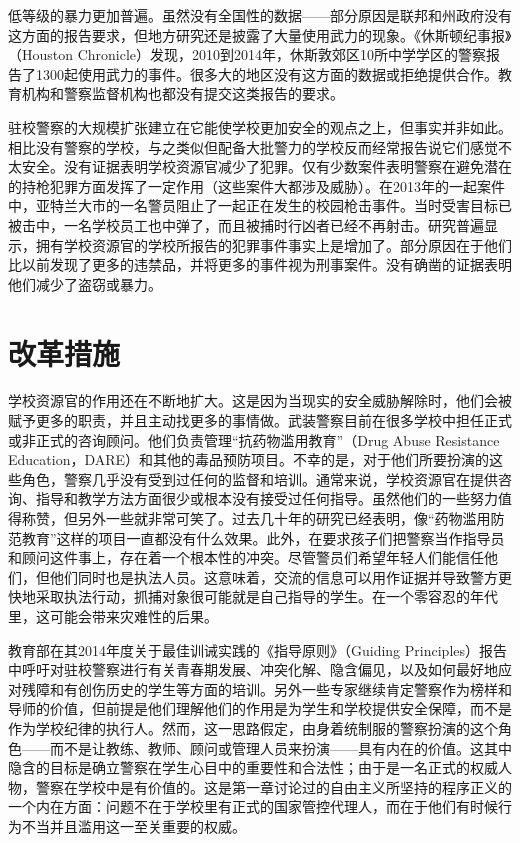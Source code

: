 \documentclass[fontset=fandol, a4paper, 12pt, openright]{ctexbook}
\begin{document}
低等级的暴力更加普遍。虽然没有全国性的数据——部分原因是联邦和州政府没有这方面的报告要求，但地方研究还是披露了大量使用武力的现象。《休斯顿纪事报》（Houston Chronicle）发现，2010到2014年，休斯敦郊区10所中学学区的警察报告了1300起使用武力的事件。很多大的地区没有这方面的数据或拒绝提供合作。教育机构和警察监督机构也都没有提交这类报告的要求。

驻校警察的大规模扩张建立在它能使学校更加安全的观点之上，但事实并非如此。相比没有警察的学校，与之类似但配备大批警力的学校反而经常报告说它们感觉不太安全。没有证据表明学校资源官减少了犯罪。仅有少数案件表明警察在避免潜在的持枪犯罪方面发挥了一定作用（这些案件大都涉及威胁）。在2013年的一起案件中，亚特兰大市的一名警员阻止了一起正在发生的校园枪击事件。当时受害目标已被击中，一名学校员工也中弹了，而且被捕时行凶者已经不再射击。研究普遍显示，拥有学校资源官的学校所报告的犯罪事件事实上是增加了。部分原因在于他们比以前发现了更多的违禁品，并将更多的事件视为刑事案件。没有确凿的证据表明他们减少了盗窃或暴力。

\section{改革措施}

学校资源官的作用还在不断地扩大。这是因为当现实的安全威胁解除时，他们会被赋予更多的职责，并且主动找更多的事情做。武装警察目前在很多学校中担任正式或非正式的咨询顾问。他们负责管理“抗药物滥用教育”（Drug Abuse Resistance Education，DARE）和其他的毒品预防项目。不幸的是，对于他们所要扮演的这些角色，警察几乎没有受到过任何的监督和培训。通常来说，学校资源官在提供咨询、指导和教学方法方面很少或根本没有接受过任何指导。虽然他们的一些努力值得称赞，但另外一些就非常可笑了。过去几十年的研究已经表明，像“药物滥用防范教育”这样的项目一直都没有什么效果。此外，在要求孩子们把警察当作指导员和顾问这件事上，存在着一个根本性的冲突。尽管警员们希望年轻人们能信任他们，但他们同时也是执法人员。这意味着，交流的信息可以用作证据并导致警方更快地采取执法行动，抓捕对象很可能就是自己指导的学生。在一个零容忍的年代里，这可能会带来灾难性的后果。

教育部在其2014年度关于最佳训诫实践的《指导原则》（Guiding Principles）报告中呼吁对驻校警察进行有关青春期发展、冲突化解、隐含偏见，以及如何最好地应对残障和有创伤历史的学生等方面的培训。另外一些专家继续肯定警察作为榜样和导师的价值，但前提是他们理解他们的作用是为学生和学校提供安全保障，而不是作为学校纪律的执行人。然而，这一思路假定，由身着统制服的警察扮演的这个角色——而不是让教练、教师、顾问或管理人员来扮演——具有内在的价值。这其中隐含的目标是确立警察在学生心目中的重要性和合法性；由于是一名正式的权威人物，警察在学校中是有价值的。这是第一章讨论过的自由主义所坚持的程序正义的一个内在方面：问题不在于学校里有正式的国家管控代理人，而在于他们有时候行为不当并且滥用这一至关重要的权威。
\end{document}

